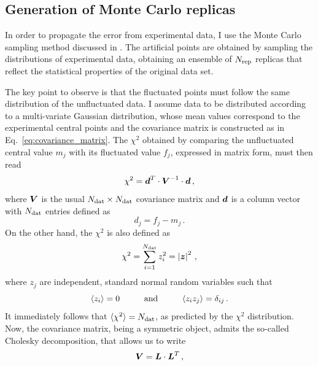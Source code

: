 \subsection{Generation of Monte Carlo replicas}
\label{sec:gen_MC}
In order to propagate the error from experimental data, I use the Monte Carlo sampling method discussed in . The artificial points are obtained by sampling the distributions of experimental data, obtaining an ensemble of $N_{\textrm{rep}}$ replicas that reflect the statistical properties of the original data set.%

The key point to observe is that the fluctuated points must follow the same distribution of the unfluctuated data. I assume data to be distributed according to a multi-variate Gaussian distribution, whose mean values correspond to the experimental central points and the covariance matrix is constructed as in Eq.~\eqref{eq:covariance_matrix}. The $\chi^2$ obtained by comparing the unfluctuated central value $m_j$ with its fluctuated value $f_j$, expressed in matrix form, must then read
\begin{equation}
  \chi^2 = {\vb*{d}}^{T} \cdot \vb*{V}^{-1} \cdot \vb*{d} \,,
  \label{eq:chi_fluc}
\end{equation}
where $\vb*{V}$ is the usual $N_{\textrm{dat}} \times N_{\textrm{dat}}$ covariance matrix and $\vb*{d}$ is a column vector with $N_{\textrm{dat}}$ entries defined as
\begin{equation}
  d_j = f_j - m_j \,.
\end{equation}
On the other hand, the $\chi^2$ is also defined as
\begin{equation}
  \chi^2 = \sum_{i=1}^{N_{\textrm{dat}}} z_i^2 = \left| \vb*{z} \right|^2 \,,
  \label{eq:chi2_normal}
\end{equation}
where $z_j$ are independent, standard normal random variables such that
\begin{equation}
  \langle z_i \rangle = 0 \hspace{10mm} \T{and} \hspace{10mm}  \langle z_i z_j \rangle = \delta_{ij} \,.
\end{equation}
It immediately follows that $\langle \chi^2 \rangle = N_{\textrm{dat}}$, as predicted by the $\chi^2$ distribution. Now, the covariance matrix, being a symmetric object, admits the so-called Cholesky decomposition, that allows us to write
\begin{equation}
  \vb*{V} = \vb*{L} \cdot {\vb*{L}}^{T} \,,
\end{equation}
